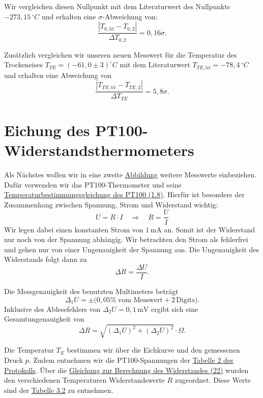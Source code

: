 Wir vergleichen diesen Nullpunkt mit dem Literaturwert des Nullpunkts $-273,15\,^\circ C$ und erhalten eine $\sigma$-Abweichung von:
\begin{equation}
    \frac{\left| T_{0,lit} - T_{0,2} \right|}{\Delta T_{0,2}} = 0,16\sigma.
\end{equation}

Zusätzlich vergleichen wir unseren neuen Messwert für die Temperatur des Trockeneises $T_{TE} = (-61,0 \pm 3)^\circ C$ mit dem Literaturwert $T_{TE,lit} = -78,4 \, ^\circ C$ und erhalten eine Abweichung von 
\begin{equation}
    \frac{\left| T_{TE,lit} - T_{TE,2} \right|}{\Delta T_{TE}} = 5,8 \sigma.
\end{equation}

\section{Eichung des PT100-Widerstandsthermometers}

Als Nächstes wollen wir in eine zweite \hyperref[fig:graphisch_temp_widerstand]{Abbildung} weitere Messwerte einbeziehen. Dafür verwenden wir das PT100-Thermometer und seine \hyperref[eq:t_pt100]{Temperaturbestimmungsgleichung des PT100 (1.8)}.
Hierfür ist besonders der Zusammenhang zwischen Spannung, Strom und Widerstand wichtig:
\begin{equation}
    U = R \cdot I \quad\Rightarrow\quad R = \frac{U}{I}
    \label{eq:uri}
\end{equation}
Wir legen dabei einen konstanten Strom von $1\,\text{mA}$ an. Somit ist der Widerstand nur noch von der Spannung abhängig. Wir betrachten den Strom als fehlerfrei und gehen nur von einer Ungenauigkeit der Spannung aus.
Die Ungenauigkeit des Widerstands folgt dann zu
\begin{equation}
    \Delta R = \frac{\Delta U}{I}.
    \label{eq:delta_uri}
\end{equation}

Die Messgenauigkeit des benutzten Multimeters beträgt
\[
\Delta_1 U = \pm\bigl(0,05\%\ \text{vom Messwert} + 2\,\text{Digits}\bigr).
\]
Inklusive des Ablesefehlers von $\Delta_2 U = 0,1\,\text{mV}$ ergibt sich eine Gesamtungenauigkeit von
\begin{equation}
    \Delta R = \sqrt{(\Delta_1 U)^2 + (\Delta_2 U)^2} \cdot \Omega.
\end{equation}

Die Temperatur $T_E$ bestimmen wir über die Eichkurve und den gemessenen Druck $p$. Zudem entnehmen wir die PT100-Spannungen der \hyperref[Protokoll]{Tabelle 2 des Protokolls}. Über die \hyperref[eq:uri]{Gleichung zur Berechnung des Widerstandes (22)} wurden den verschiedenen Temperaturen Widerstandswerte $R$ zugeordnet. Diese Werte sind der \hyperref[tab:pt_100]{Tabelle 3.2} zu entnehmen.

